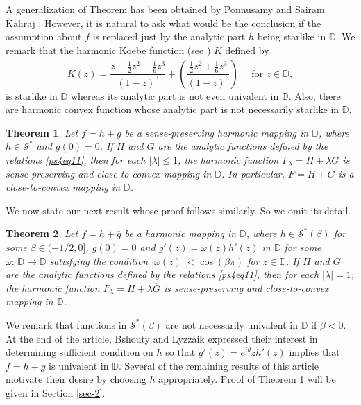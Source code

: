 \documentclass[a4paper,12pt]{amsart}
\newtheorem{thm}{Theorem}
\theoremstyle{definition}
\newcounter{tmp}
\begin{document}
A generalization of Theorem {} has been obtained by Ponnusamy and Sairam Kaliraj \cite{PonSai-14a}. However, it is natural
to ask what would be the conclusion if the assumption about $f$ is replaced just by the analytic part $h$ being starlike in ${{\mathbb D}}$.
We remark that the harmonic Koebe function (see \cite{Clunie-Small-84,Du,SaRa2013}) $K$ defined by
$$K(z)=\frac{z-\frac{1}{2}z^2+\frac{1}{6}z^3}{(1-z)^3}+
\overline{\left (\frac{\frac{1}{2}z^2+\frac{1}{6}z^3}{(1-z)^3}\right )} \quad \mbox{ for $z\in {{\mathbb D}}$},
$$
is starlike in ${{\mathbb D}}$ whereas its analytic part is not even univalent in ${{\mathbb D}}$. Also, there are harmonic convex function
whose analytic part is not necessarily starlike in ${{\mathbb D}}$.

\begin{thm}\label{Thm-Alex2}
Let $f=h+\overline{g}$ be a sense-preserving harmonic mapping in ${{\mathbb D}}$, where $h\in {\mathcal S}^*$ and $g(0)=0$. If $H$ and $G$ are
the analytic functions defined by the relations \eqref{ps4eq11}, then for each $|\lambda|\leq 1$,
the harmonic function $F_{\lambda} =H+\lambda\overline{G}$ is sense-preserving and close-to-convex mapping in ${{\mathbb D}}$. In particular,
$F =H+\overline{G}$ is a close-to-convex mapping in ${{\mathbb D}}$.
\end{thm}

We now state our next result whose proof follows similarly. So we omit its detail.

\begin{thm}\label{Thm-Alex3}
Let $f=h+\overline{g}$ be a harmonic mapping in ${{\mathbb D}}$, where $h\in {\mathcal S}^*(\beta)$ for some
$\beta \in (-1/2,0]$, $g(0)=0$ and $ g'(z)=\omega (z)h'(z)$ in ${{\mathbb D}}$ for some $\omega :\,{{\mathbb D}}\rightarrow {{\mathbb D}}$ satisfying the condition
$|\omega (z)|<\cos (\beta \pi)$ for $z\in{{\mathbb D}}$. If $H$ and $G$ are
the analytic functions defined by the relations \eqref{ps4eq11}, then for each $|\lambda|= 1$,
the harmonic function $F_{\lambda} =H+\lambda\overline{G}$ is sense-preserving and close-to-convex mapping in ${{\mathbb D}}$.
\end{thm}

We remark that functions in ${\mathcal S}^*(\beta)$ are not necessarily univalent in ${{\mathbb D}}$ if $\beta <0$.
At the end of the article, Bshouty and Lyzzaik \cite{Bshouty-Lyzzaik-2010} expressed their
interest in determining sufficient condition on $h$ so that $ g'(z)=e^{i\theta}zh'(z)$ implies that $f=h+\overline{g}$ is univalent in ${{\mathbb D}}$.
Several of the remaining results of this article motivate their desire by choosing $h$ appropriately.
Proof of Theorem \ref{Thm-Alex2} will be given in Section \ref{sec-2}.
\end{document}
